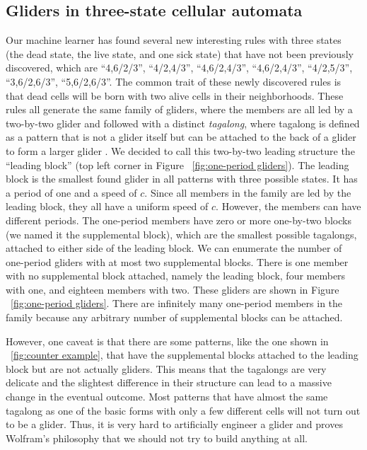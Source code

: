 \documentclass[12pt]{article}
\numberwithin{figure}{section} %
\begin{document}
\subsection{Gliders in three-state cellular automata}
Our machine learner has found several new interesting rules with three states (the dead state, the live state, and one sick state) that have not been previously discovered, which are “4,6/2/3”, “4/2,4/3”, “4,6/2,4/3”, “4,6/2,4/3”, “4/2,5/3”, “3,6/2,6/3”, “5,6/2,6/3”. The common trait of these newly discovered rules is that dead cells will be born with two alive cells in their neighborhoods. These rules all generate the same family of gliders, where the members are all led by a two-by-two glider and followed with a distinct \textit{tagalong}, where tagalong is defined as a pattern that is not a glider itself but can be attached to the back of a glider to form a larger glider \cite{spaceship}. We decided to call this two-by-two leading structure the “leading block” (top left corner in Figure ~\ref{fig:one-period gliders}). The leading block is the smallest found glider in all patterns with three possible states. It has a period of one and a speed of $c$. Since all members in the family are led by the leading block, they all have a uniform speed of $c$. However, the members can have different periods. The one-period members have zero or more one-by-two blocks (we named it the supplemental block), which are the smallest possible tagalongs, attached to either side of the leading block. We can enumerate the number of one-period gliders with at most two supplemental blocks. There is one member with no supplemental block attached, namely the leading block, four members with one, and eighteen members with two. These gliders are shown in Figure ~\ref{fig:one-period gliders}. There are infinitely many one-period members in the family because any arbitrary number of supplemental blocks can be attached. 

However, one caveat is that there are some patterns, like the one shown in ~\ref{fig:counter example}, that have the supplemental blocks attached to the leading block but are not actually gliders. This means that the tagalongs are very delicate and the slightest difference in their structure can lead to a massive change in the eventual outcome. Most patterns that have almost the same tagalong as one of the basic forms with only a few different cells will not turn out to be a glider. Thus, it is very hard to artificially engineer a glider and proves Wolfram's philosophy that we should not try to build anything at all. 
\end{document}
